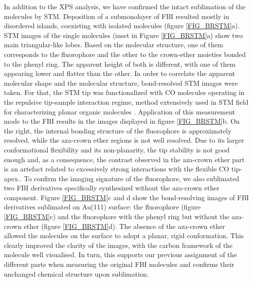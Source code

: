 \documentclass[aps,prl,reprint,longbibliography,superscriptaddress, english]{revtex4-1}
\begin{document}
In addition to the XPS analysis, we have confirmed the intact sublimation of the molecules by STM. Deposition of a submonolayer of FBI resulted mostly in disordered islands, coexisting with isolated molecules (figure {\ref{FIG_BRSTM}a}). STM images of the single molecules (inset in Figure  {\ref{FIG_BRSTM}a}) show two main triangular-like lobes. Based on the molecular structure, one of them corresponds to the fluorophore and the other to the crown-ether moieties bonded to the phenyl ring. The apparent height of both is different, with one of them appearing lower and flatter than the other. In order to correlate the apparent molecular shape and the molecular structure, bond-resolved STM images were taken. For that, the STM tip was functionalized with CO molecules operating in the repulsive tip-sample interaction regime, method extensively used in STM field for characterizing planar organic molecules \cite{gross_recent_2011,gross_atomic_2018}. Application of this measurement mode to the FBI results in the images displayed in figure \ref{FIG_BRSTM}b. On the right, the internal bonding structure of the fluorophore is approximately resolved, while the aza-crown ether regions is not well resolved. Due to its larger conformational flexibility and its non-planarity, the tip stability is not good enough and, as a consequence, the contrast observed in the aza-crown ether part is an artefact related to excessively strong interactions with the flexible CO tip-apex.\cite{moll_mechanisms_2010,hapala_mechanism_2014}. To confirm the imaging signature of the fluorophore, we also sublimated two FBI derivatives specifically synthesized without the aza-crown ether component. Figure \ref{FIG_BRSTM}c and d show the bond-resolving images of FBI derivatives sublimated on Au(111) surface: the fluorophore (figure {\ref{FIG_BRSTM}c}) and the fluorophore with the phenyl ring but without the aza-crown ether (figure {\ref{FIG_BRSTM}d}). The absence of the aza-crown ether allowed the molecules on the surface to adopt a planar, rigid conformation. This clearly improved the clarity of the images, with the carbon framework of the molecule well visualised. In turn, this supports our previous assignment of the different parts when measuring the original FBI molecules and confirms their unchanged chemical structure upon sublimation.  
\end{document}

